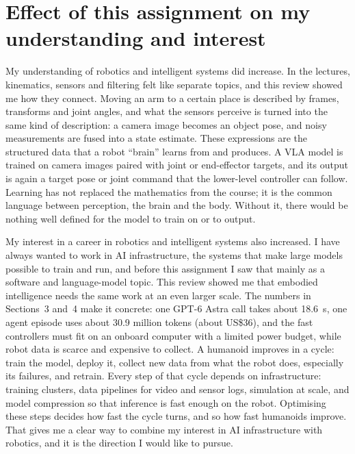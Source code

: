 \documentclass[11pt,a4paper]{article}
\begin{document}
\section{Effect of this assignment on my understanding and interest}

My understanding of robotics and intelligent systems did increase.  In the
lectures, kinematics, sensors and filtering felt like separate topics, and
this review showed me how they connect.  Moving an arm to a certain place is
described by frames, transforms and joint angles, and what the sensors perceive
is turned into the same kind of description: a camera image becomes an object
pose, and noisy measurements are fused into a state estimate.  These
expressions are the structured data that a robot ``brain'' learns from and
produces.  A VLA model is trained on camera images paired with joint or
end-effector targets, and its output is again a target pose or joint command
that the lower-level controller can follow.  Learning has not replaced the
mathematics from the course; it is the common language between perception, the
brain and the body.  Without it, there would be nothing well defined for the
model to train on or to output.

My interest in a career in robotics and intelligent systems also increased.  I
have always wanted to work in AI infrastructure, the systems that make large
models possible to train and run, and before this assignment I saw that mainly
as a software and language-model topic.  This review showed me that embodied
intelligence needs the same work at an even larger scale.  The numbers in
Sections~3 and~4 make it concrete: one GPT-6 Astra call takes about 18.6~s,
one agent episode uses about 30.9 million tokens (about US\$36), and the fast
controllers must fit on an onboard computer with a limited power budget, while
robot data is scarce and expensive to collect.  A humanoid improves in a
cycle: train the model, deploy it, collect new data from what the robot does,
especially its failures, and retrain.  Every step of that cycle depends on
infrastructure: training clusters, data pipelines for video and sensor logs,
simulation at scale, and model compression so that inference is fast enough on
the robot.  Optimising these steps decides how fast the cycle turns, and so how
fast humanoids improve.  That gives me a clear way to combine my interest in AI
infrastructure with robotics, and it is the direction I would like to pursue.

\end{document}
